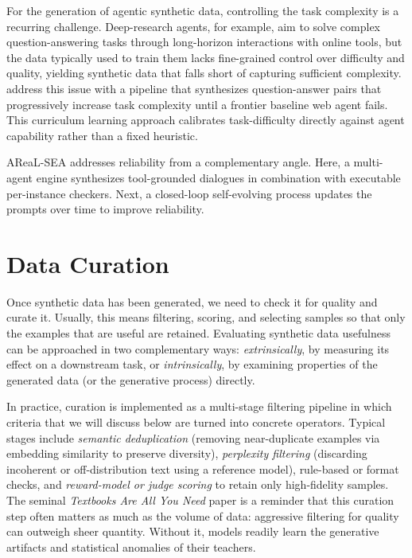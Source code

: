 For the generation of agentic synthetic data, controlling the task complexity is a recurring challenge. Deep-research agents, for example, aim to solve complex question-answering tasks through long-horizon interactions with online tools, but the data typically used to train them lacks fine-grained control over difficulty and quality, yielding synthetic data that falls short of capturing sufficient complexity. \citet{pandit2025synthesizingagenticdataweb} address this issue with a pipeline that synthesizes question-answer pairs that progressively increase task complexity until a frontier baseline web agent fails. This curriculum learning approach  calibrates task-difficulty directly against agent capability rather than a fixed heuristic. 

AReaL-SEA \citep{gao2026selfevolvingsyntheticdataverifiablereward} addresses reliability from a complementary angle. Here, a multi-agent engine synthesizes tool-grounded dialogues in combination with executable per-instance checkers. Next, a closed-loop self-evolving process updates the prompts over time to improve reliability.



\section{Data Curation}
\label{sec:data-cur}

Once synthetic data has been generated, we need to check it for quality and curate it. Usually, this means filtering, scoring, and selecting samples so that only the examples that are useful are retained. Evaluating synthetic data usefulness can be approached in two complementary ways: \emph{extrinsically}, by measuring its effect on a downstream task, or \emph{intrinsically}, by examining properties of the generated data (or the generative process) directly.

In practice, curation is implemented as a multi-stage filtering pipeline in which  criteria that we will discuss below are turned into concrete operators. Typical stages include \emph{semantic deduplication} (removing near-duplicate examples via embedding similarity to preserve diversity), \emph{perplexity filtering} (discarding incoherent or off-distribution text using a reference model), rule-based or format checks, and \emph{reward-model or judge scoring} to retain only high-fidelity samples. The seminal {\em Textbooks Are All You Need} paper \citep{gunasekar2023textbooksneed} is a reminder that this curation step often matters as much as the volume of data: aggressive filtering for quality can outweigh sheer quantity. Without it, models readily learn the generative artifacts and statistical anomalies of their teachers.

